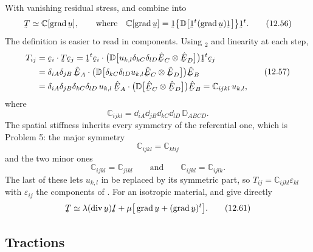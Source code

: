 With vanishing residual stress,  and  combine into
\begin{equation}
   \bT\simeq\mathbb{C}[\grad\bu],\qquad\text{where}\quad
   \mathbb{C}[\grad\bu]
   =\shift\big\{\mathbb{D}\big[\shift^{t}(\grad\bu)\shift\big]\big\}
   \shift^{t}.
   \tag{12.56}\label{eq:12.56}
\end{equation}
The definition is easier to read in components. Using
$_{2}$ and linearity at each step,
\begin{equation}
\begin{aligned}
   T_{ij}&=\ip{\be_{i}}{\bT\be_{j}}
   =\ip{\shift^{t}\be_{i}}
     {\big(\mathbb{D}\big[u_{k,l}\dd_{kC}\dd_{lD}
      \hbE_{C}\otimes\hbE_{D}\big]\big)\shift^{t}\be_{j}}\\
   &=\dd_{iA}\dd_{jB}\,\hbE_{A}\cdot
     \big(\mathbb{D}\big[\dd_{kC}\dd_{lD}u_{k,l}
     \hbE_{C}\otimes\hbE_{D}\big]\big)\hbE_{B}\\
   &=\dd_{iA}\dd_{jB}\dd_{kC}\dd_{lD}\,u_{k,l}\,
     \hbE_{A}\cdot\big(\mathbb{D}\big[\hbE_{C}\otimes\hbE_{D}\big]\big)
     \hbE_{B}
   =\mathbb{C}_{ijkl}\,u_{k,l},
\end{aligned}
   \tag{12.57}\label{eq:12.57}
\end{equation}
where
\begin{equation}
   \mathbb{C}_{ijkl}
   =\dd_{iA}\dd_{jB}\dd_{kC}\dd_{lD}\,\mathbb{D}_{ABCD}.
   \tag{12.58}\label{eq:12.58}
\end{equation}
The spatial stiffness inherits every symmetry of the referential one,
which is Problem 5: the major symmetry
\begin{equation}
   \mathbb{C}_{ijkl}=\mathbb{C}_{klij}
   \tag{12.59}\label{eq:12.59}
\end{equation}
and the two minor ones
\begin{equation}
   \mathbb{C}_{ijkl}=\mathbb{C}_{jikl}
   \qquad\text{and}\qquad
   \mathbb{C}_{ijkl}=\mathbb{C}_{ijlk}.
   \tag{12.60}\label{eq:12.60}
\end{equation}
The last of these lets $u_{k,l}$ in  be replaced by its
symmetric part, so $T_{ij}=\mathbb{C}_{ijkl}\varepsilon_{kl}$ with
$\varepsilon_{ij}$ the components of . For an isotropic
material,  and  give directly
\begin{equation}
   \bT\simeq\lambda(\dvg\bu)\I
   +\mu\big[\grad\bu+(\grad\bu)^{t}\big].
   \tag{12.61}\label{eq:12.61}
\end{equation}

\subsection*{Tractions}

